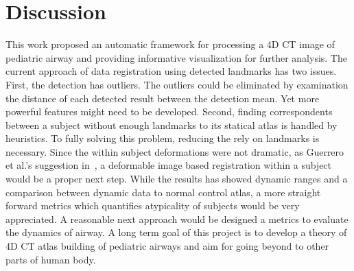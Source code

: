 \section{Discussion}
\label{sec:discussion}
This work proposed an automatic framework for processing a 4D CT image of pediatric airway and providing informative visualization for further analysis.
The current approach of data registration using detected landmarks has two issues.
First, the detection has outliers.
The outliers could be eliminated by examination the distance of each detected result between the detection mean.
Yet more powerful features might need to be developed.
Second, finding correspondents between a subject without enough landmarks to its statical atlas is handled by heuristics.
To fully solving this problem, reducing the rely on landmarks is necessary.
Since the within subject deformations were not dramatic, as Guerrero et al.'s suggestion in~\cite{guerrero2006dynamic}, a deformable image based registration within a subject would be a proper next step.
While the results has showed dynamic ranges and a comparison between dynamic data to normal control atlas, a more straight forward metrics which quantifies atypicality of subjects would be very appreciated.
A reasonable next approach would be designed a metrics to evaluate the dynamics of airway.
A long term goal of this project is to develop a theory of 4D CT atlas building of pediatric airways and aim for going beyond to other parts of human body.